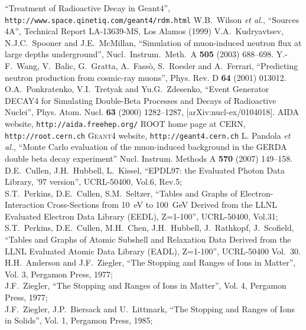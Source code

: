 \documentclass[article]{IEEEtran}
\begin{document}
\begin{thebibliography}{1}
``Treatment of Radioactive Decay in Geant4'',
\texttt{http://www.space.qinetiq.com/geant4/rdm.html}
%
%
 W.B.~Wilson \emph{et al.}, ``Sources 4A'', Technical
Report LA-13639-MS, Los Alamos (1999)
%
 V.A.~Kudryavtsev, N.J.C.~Spooner and J.E.~McMillan,
``Simulation of muon-induced neutron flux at large depths underground'',
 Nucl.\ Instrum.\ Meth.\  A {\bf 505} (2003) 688--698.	
%
Y.-F.~Wang, V.~Balic, G.~Gratta, A.~Fass\`{o}, S.~Roesler and A.~Ferrari,
``Predicting neutron production from cosmic-ray muons'',
Phys. Rev. D \textbf{64} (2001) 013012.
%
O.A.~Ponkratenko, V.I.~Tretyak and Yu.G.~Zdesenko, 
``Event Generator DECAY4 for Simulating Double-Beta Processes and Decays of Radioactive Nuclei'',
Phys. Atom. Nucl. \textbf{63} (2000) 1282--1287,
[arXiv:nucl-ex/0104018].
%
AIDA website, \texttt{http://aida.freehep.org/}
%
ROOT home page at CERN, \texttt{http://root.cern.ch}
%
\textsc{Geant4} website, \texttt{http://geant4.cern.ch}
%
L. Pandola \emph{et al.},
``Monte Carlo evaluation of the muon-induced background in the GERDA double beta decay experiment''
Nucl. Instrum. Methods A \textbf{570} (2007) 149--158.
%
D.E.~Cullen, J.H.~Hubbell, L.~Kissel, ``EPDL97: the Evaluated Photon
Data Library, '97 version'', UCRL-50400, Vol.6, Rev.5; \\
S.T.~Perkins, D.E.~Cullen, S.M.~Seltzer, ``Tables and Graphs of
Electron-Interaction Cross-Sections from 10~eV to 100~GeV
Derived from the LLNL Evaluated Electron Data Library (EEDL), Z=1-100'',
UCRL-50400, Vol.31; \\
S.T.~Perkins, D.E.~Cullen, M.H.~Chen, J.H.~Hubbell, J.~Rathkopf,
J.~Scofield,
``Tables and Graphs of Atomic Subshell and Relaxation Data Derived
from the LLNL Evaluated Atomic Data Library (EADL), Z=1-100'',
UCRL-50400 Vol.~30.
%
H.H.~Anderson and J.F.~Ziegler, ``The Stopping and Ranges of Ions in Matter'', Vol. 3,
Pergamon Press, 1977; \\
J.F.~Ziegler, ``The Stopping and Ranges of Ions in Matter'', Vol. 4,
Pergamon Press, 1977; \\
J.F.~Ziegler, J.P.~Biersack and U.~Littmark, ``The Stopping and Ranges of Ions in Solids'', Vol. 1,
Pergamon Press, 1985; \\

\end{thebibliography}
\end{document}
